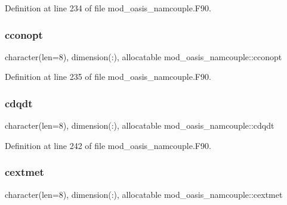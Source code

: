 Definition at line 234 of file mod\+\_\+oasis\+\_\+namcouple.\+F90.

\mbox{\label{namespacemod__oasis__namcouple_a240979dfe7369da899b0cfe2aeba4f9d}} 
\subsubsection{\texorpdfstring{cconopt}{cconopt}}
{\footnotesize\ttfamily character(len=8), dimension(\+:), allocatable mod\+\_\+oasis\+\_\+namcouple\+::cconopt\hspace{0.3cm}{\ttfamily [private]}}



Definition at line 235 of file mod\+\_\+oasis\+\_\+namcouple.\+F90.

\mbox{\label{namespacemod__oasis__namcouple_a9c5a3b3a864f3feb95eddc08616b998e}} 
\subsubsection{\texorpdfstring{cdqdt}{cdqdt}}
{\footnotesize\ttfamily character(len=8), dimension(\+:), allocatable mod\+\_\+oasis\+\_\+namcouple\+::cdqdt\hspace{0.3cm}{\ttfamily [private]}}



Definition at line 242 of file mod\+\_\+oasis\+\_\+namcouple.\+F90.

\mbox{\label{namespacemod__oasis__namcouple_a1066d92e6c9301bdb46ddda7edd7d29a}} 
\subsubsection{\texorpdfstring{cextmet}{cextmet}}
{\footnotesize\ttfamily character(len=8), dimension(\+:), allocatable mod\+\_\+oasis\+\_\+namcouple\+::cextmet\hspace{0.3cm}{\ttfamily [private]}}



